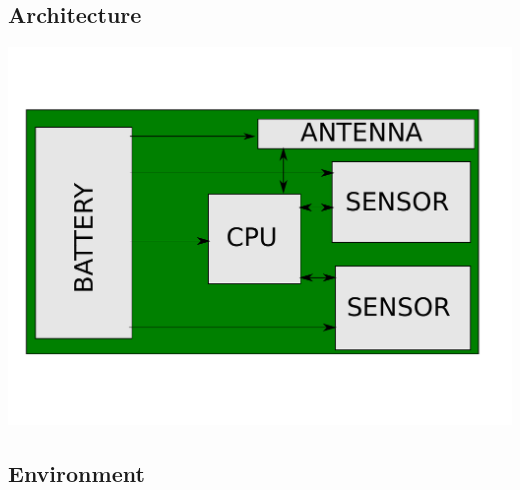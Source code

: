 \subsection{Architecture}
\begin{center}
	\includegraphics[scale=0.6]{img/board.pdf}
\end{center}

\subsection{Environment}

